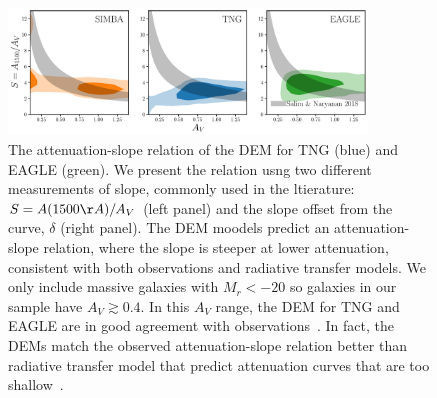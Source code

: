 \begin{figure}
\begin{center}
    \includegraphics[width=0.85\textwidth]{figs/abc_slope_AV_all.pdf}
    \caption{\label{fig:slope}
    The attenuation-slope relation of the DEM for TNG (blue) and EAGLE (green).
    We present the relation usng two different measurements of slope, 
    commonly used in the ltierature: $S = A(1500\AA)/A_V$ (left panel) and
    the slope offset from the \cite{calzetti2001} curve, $\delta$ (right panel).
    The DEM moodels predict an attenuation-slope relation, where the slope is
    steeper at lower attenuation, consistent with both observations and
    radiative transfer models. We only include massive galaxies with $M_r <
    -20$ so galaxies in our sample have $A_V \gtrsim 0.4$. In this $A_V$ range,
    the DEM for TNG and EAGLE are in good agreement with observations~\cite{salim2020}. 
    In fact, the DEMs match the observed attenuation-slope relation better 
    than radiative transfer model that predict attenuation curves that are
    too shallow~\citep{inoue2005, chevallard2013, trayford2020}.
    }
\end{center}
\end{figure}





